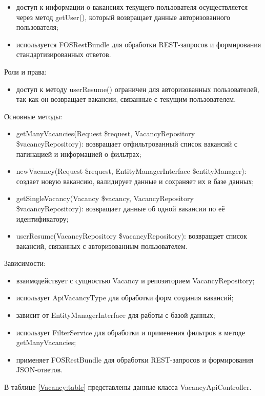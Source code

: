 \begin{itemize}
	\item доступ к информации о вакансиях текущего пользователя осуществляется через метод getUser(), который возвращает данные авторизованного пользователя;
	\item используется FOSRestBundle для обработки REST-запросов и формирования стандартизированных ответов.
\end{itemize}

Роли и права:
\begin{itemize}
	\item доступ к методу userResume() ограничен для авторизованных пользователей, так как он возвращает вакансии, связанные с текущим пользователем.
\end{itemize}

Основные методы:
\begin{itemize}
	\item getManyVacancies(Request \$request, VacancyRepository \$vacancyRepository): возвращает отфильтрованный список вакансий с пагинацией и информацией о фильтрах;
	\item newVacancy(Request \$request, EntityManagerInterface \$entityManager): создает новую вакансию, валидирует данные и сохраняет их в базе данных;
	\item getSingleVacancy(Vacancy \$vacancy, VacancyRepository \$vacancyRepository): возвращает данные об одной вакансии по её идентификатору;
	\item userResume(VacancyRepository \$vacancyRepository): возвращает список вакансий, связанных с авторизованным пользователем.
\end{itemize}

Зависимости:

\begin{itemize}
	\item взаимодействует с сущностью Vacancy и репозиторием VacancyRepository;
	\item использует ApiVacancyType для обработки форм создания вакансий;
	\item зависит от EntityManagerInterface для работы с базой данных;
	\item использует FilterService для обработки и применения фильтров в методе getManyVacancies;
	\item применяет FOSRestBundle для обработки REST-запросов и формирования JSON-ответов.
\end{itemize}

В таблице \ref{Vacancy:table} представлены данные класса VacancyApiController.

